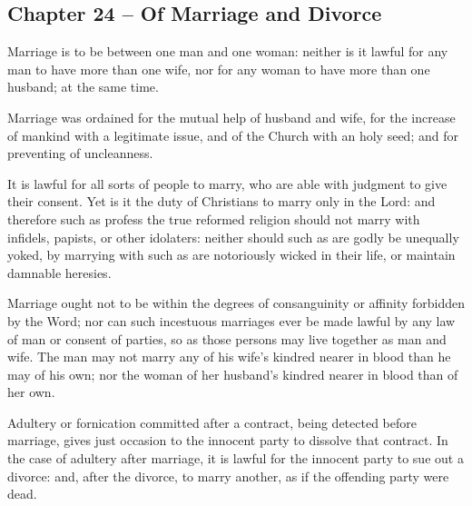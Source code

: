 \begin{outerlst}[left=0pt,labelsep=0pt]
\item
{}
\section{Chapter 24 -- Of Marriage and Divorce}
\begin{innerlst}[resume*]

\item Marriage is to be between one man and one woman: neither is it lawful for any man to have more than one wife, nor for any woman to have more than one husband; at the same time.   

\item Marriage was ordained for the mutual help of husband and wife, for the increase of mankind with a legitimate issue, and of the Church with an holy seed; and for preventing of uncleanness.   

\item It is lawful for all sorts of people to marry, who are able with judgment to give their consent. Yet is it the duty of Christians to marry only in the Lord: and therefore such as profess the true reformed religion should not marry with infidels, papists, or other idolaters: neither should such as are godly be unequally yoked, by marrying with such as are notoriously wicked in their life, or maintain damnable heresies.    

\item Marriage ought not to be within the degrees of consanguinity or affinity forbidden by the Word; nor can such incestuous marriages ever be made lawful by any law of man or consent of parties, so as those persons may live together as man and wife. The man may not marry any of his wife's kindred nearer in blood than he may of his own; nor the woman of her husband's kindred nearer in blood than of her own.   

\item Adultery or fornication committed after a contract, being detected before marriage, gives just occasion to the innocent party to dissolve that contract. In the case of adultery after marriage, it is lawful for the innocent party to sue out a divorce: and, after the divorce, to marry another, as if the offending party were dead.   


\end{innerlst}
\end{outerlst}
